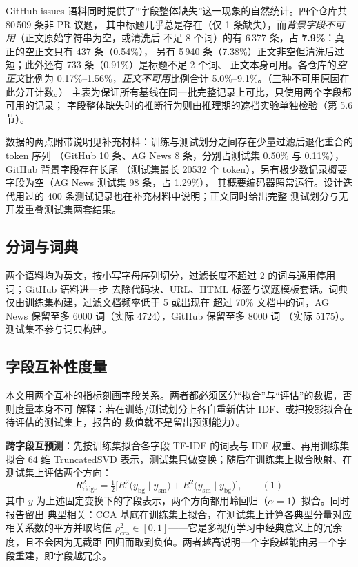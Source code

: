 \documentclass{article}
\begin{document}
GitHub issues 语料同时提供了“字段整体缺失”这一现象的自然统计。四个仓库共 80\,509 条非 PR 议题，
其中标题几乎总是存在（仅 1 条缺失），而\emph{背景字段不可用}（正文原始字符串为空，或清洗后
不足 8 个词）的有 6\,377 条，占 \textbf{7.9\%}：真正的空正文只有 437 条（0.54\%），
另有 5\,940 条（7.38\%）正文非空但清洗后过短；此外还有 733 条（0.91\%）是标题不足 2 个词、
正文本身可用。各仓库的\emph{空正文}比例为 0.17\%--1.56\%，\emph{正文不可用}比例合计
5.0\%--9.1\%。（三种不可用原因在此分开计数。）
主表为保证所有基线在同一批完整记录上可比，只使用两个字段都可用的记录；
字段整体缺失时的推断行为则由推理期的遮挡实验单独检验（第 5.6 节）。

数据的两点附带说明见补充材料：训练与测试划分之间存在少量过滤后退化重合的 token 序列
（GitHub 10 条、AG News 8 条，分别占测试集 0.50\% 与 0.11\%），GitHub 背景字段存在长尾
（测试集最长 20532 个 token），另有极少数记录概要字段为空（AG News 测试集 98 条，占 1.29\%），
其概要编码器照常运行。设计迭代用过的 400 条测试记录也在补充材料中说明；正文同时给出完整
测试划分与无开发重叠测试集两套结果。

\subsection{分词与词典}

两个语料均为英文，按小写字母序列切分，过滤长度不超过 2 的词与通用停用词；GitHub 语料进一步
去除代码块、URL、HTML 标签与议题模板套话。词典仅由训练集构建，过滤文档频率低于 5 或出现在
超过 70\% 文档中的词，AG News 保留至多 6000 词（实际 4724），GitHub 保留至多 8000 词
（实际 5175）。测试集不参与词典构建。

\subsection{字段互补性度量}

本文用两个互补的指标刻画字段关系。两者都必须区分“拟合”与“评估”的数据，否则度量本身不可
解释：若在训练/测试划分上各自重新估计 IDF、或把投影拟合在待评估的测试集上，报告的
数值就不是留出预测能力）。

\textbf{跨字段互预测}：先按训练集拟合各字段 TF-IDF 的词表与 IDF 权重、再用训练集拟合
64 维 TruncatedSVD 表示，测试集只做变换；随后在训练集上拟合映射、在测试集上评估两个方向：
\begin{equation}
R^2_{\mathrm{ridge}}=\tfrac12\Big[R^2\big(y_{\mathrm{bg}}\mid y_{\mathrm{sm}}\big)
+R^2\big(y_{\mathrm{sm}}\mid y_{\mathrm{bg}}\big)\Big],
\label{eq:cca}
\qquad(1)\end{equation}
其中 $y$ 为上述固定变换下的字段表示，两个方向都用岭回归（$\alpha=1$）拟合。同时报告留出
典型相关：CCA 基底在训练集上拟合，在测试集上计算各典型分量对应相关系数的平方并取均值
$\rho^2_{\mathrm{cca}}\in[0,1]$——它是多视角学习中经典意义上的冗余度，且不会因为无截距
回归而取到负值。两者越高说明一个字段越能由另一个字段重建，即字段越冗余。
\end{document}
